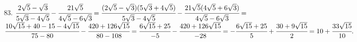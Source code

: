 83. $\cfrac{2\sqrt{5}-\sqrt{3}}{5\sqrt{3}-4\sqrt{5}}-\cfrac{21\sqrt{5}}{4\sqrt{5}-6\sqrt{3}}=
\cfrac{(2\sqrt{5}-\sqrt{3})(5\sqrt{3}+4\sqrt{5})}{5\sqrt{3}-4\sqrt{5}}-\cfrac{21\sqrt{5}(4\sqrt{5}+6\sqrt{3})}{4\sqrt{5}-6\sqrt{3}}=$\\$
\cfrac{10\sqrt{15}+40-15-4\sqrt{15}}{75-80}-\cfrac{420+126\sqrt{15}}{80-108}=
\cfrac{6\sqrt{15}+25}{-5}-\cfrac{420+126\sqrt{15}}{-28}=
-\cfrac{6\sqrt{15}+25}{5}+\cfrac{30+9\sqrt{15}}{2}=10+\cfrac{33\sqrt{15}}{10}.$\\
